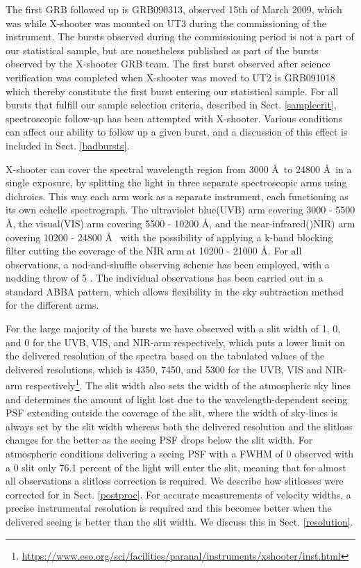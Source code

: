 \documentclass{aa}    %
\begin{document}
The first GRB followed up is GRB090313, observed 15th of March 2009, which was
while X-shooter was mounted on UT3 during the commissioning of the instrument.
The bursts observed during the commissioning period is not a part of our
statistical sample, but are nonetheless published as part of the bursts observed
by the X-shooter GRB team. The first burst observed after science verification
was completed when X-shooter was moved to UT2 is GRB091018 which thereby
constitute the first burst entering our statistical sample. For all bursts that
fulfill our sample selection criteria, described in Sect. \ref{samplecrit},
spectroscopic follow-up has been attempted with X-shooter. Various conditions
can affect our ability to follow up a given burst, and a discussion of this
effect is included in Sect. \ref{badbursts}.

X-shooter can cover the spectral wavelength region from 3000 \AA~to 24800 \AA~in
a single exposure, by splitting the light in three separate spectroscopic arms
using dichroics. This way each arm work as a separate instrument, each
functioning as its own echelle spectrograph. The ultraviolet blue(UVB) arm
covering 3000 - 5500 \AA, the visual(VIS) arm covering 5500 - 10200 \AA, and the
near-infrared()NIR) arm covering 10200 - 24800 \AA~ with the possibility of
applying a k-band blocking filter cutting the coverage of the NIR arm at 10200 -
21000 \AA. For all observations, a nod-and-shuffle observing scheme has been
employed, with a nodding throw of 5 \arcsec. The individual observations has
been carried out in a standard ABBA pattern, which allows flexibility in the sky
subtraction method for the different arms.

For the large majority of the bursts we have observed with a slit width of
1, 0, and 0 for the UVB, VIS, and NIR-arm respectively, which
puts a lower limit on the delivered resolution of the spectra based on the
tabulated values of the delivered resolutions, which is 4350, 7450, and 5300 for
the UVB, VIS and NIR-arm respectively\footnote{\url{https://www.eso.org/sci/facilities/paranal/instruments/xshooter/inst.html}}.
The slit width also sets the width of the atmospheric sky lines and determines
the amount of light lost due to the wavelength-dependent seeing PSF extending
outside the coverage of the slit, where the width of sky-lines is always set by
the slit width whereas both the delivered resolution and the slitloss changes
for the better as the seeing PSF drops below the slit width.
For atmospheric conditions delivering a seeing PSF with a FWHM of 0
observed with a 0 slit only 76.1 percent of the light will enter the slit,
meaning that for almost all observations a slitloss correction is required. We
describe how slitlosses were corrected for in Sect. \ref{postproc}.
For accurate measurements of velocity widths, a precise instrumental resolution
is required and this becomes better when the delivered seeing is better than the
slit width. We discuss this in Sect. \ref{resolution}.
\end{document}
